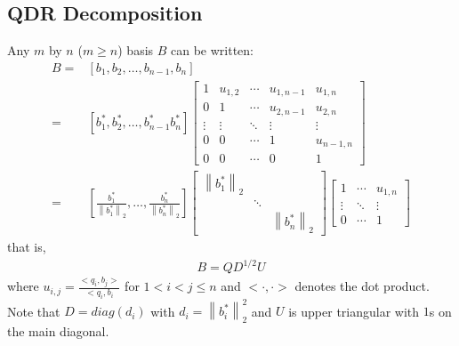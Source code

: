 \documentclass[12pt]{article}
\numberwithin{equation}{section}
\numberwithin{table}{section}
\numberwithin{figure}{section}
\newcommand{\norm}[1]{\left\lVert#1\right\rVert}
\begin{document}
\subsection{QDR Decomposition}
Any $m$ by $n$ ($m \geq n$) basis $B$ can be written:
\begin{align*}
B=&\left[b_1,b_2,\ldots,b_{n-1},b_n\right]\\
 =&\left[b^*_1,b^*_2,\ldots,b^*_{n-1}b^*_n\right]
	\left[ \begin{array}{ccccc}
		1 & u_{1,2} & \cdots & u_{1,n-1} & u_{1,n} \\
		0 & 1       & \cdots & u_{2,n-1} & u_{2,n} \\
		\vdots & \vdots & \ddots & \vdots & \vdots \\
		0 & 0       & \cdots & 1 & u_{n-1,n}       \\
		0 & 0       & \cdots & 0 & 1               
	\end{array}\right]\\
 =&\left[\frac{b^*_1}{\norm{b^*_1}_2},\ldots,\frac{b^*_n}{\norm{b^*_n}_2}\right]
   \left[\begin{array}{ccc}
		\norm{b^*_1}_2  &  \\
		&  \ddots       &  \\
		&      &\norm{b^*_n}_2 
   \end{array}\right]
   \left[\begin{array}{ccc}
		1 & \cdots & u_{1,n} \\
		\vdots & \ddots & \vdots \\
		0 & \cdots & 1
   \end{array}\right]
\end{align*}
that is,
\begin{eqnarray}
B=QD^{1/2}U \label{decomp}
\end{eqnarray}
where $u_{i,j}=\frac{<q_i,b_j>}{<q_i,b_i}$ for $1 < i < j \leq n$ and $<\cdot,\cdot>$ denotes the dot product. Note that $D=diag(d_i)$ with $d_i=\norm{b^*_i}^2_2$ and $U$ is upper triangular with $1$s on the main diagonal.
\end{document}
